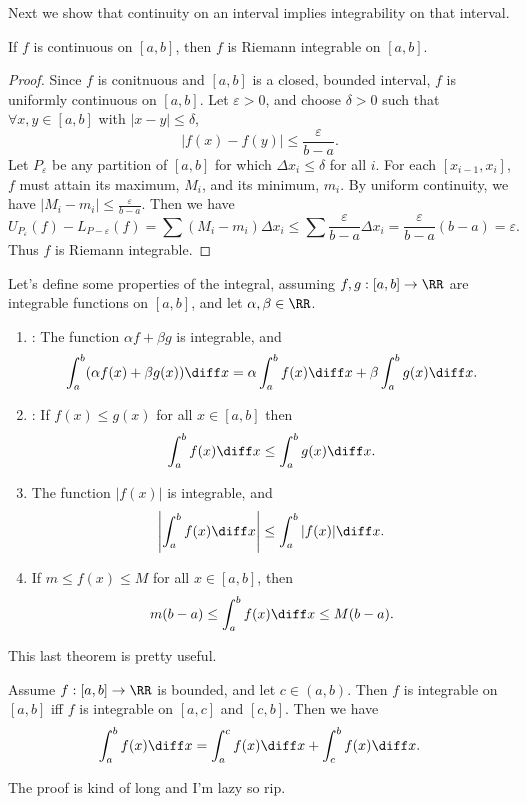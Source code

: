 Next we show that continuity on an interval implies integrability on that interval. 

\begin{theorem}
If $f$ is continuous on $[a,b]$, then $f$ is Riemann integrable on $[a,b]$. 
\end{theorem}
\begin{proof}
Since $f$ is conitnuous and $[a,b]$ is a closed, bounded interval, $f$ is uniformly continuous on $[a,b]$. Let $\varepsilon > 0$, and choose $\delta > 0$ such that $\forall x,y \in [a,b]$ with $|x-y| \leq \delta$, 
\[ |f(x) - f(y)| \leq \dfrac{\varepsilon}{b-a}. \]
Let $P_\varepsilon$ be any partition of $[a,b]$ for which $\Delta x_i \leq \delta$ for all $i$. For each $[x_{i-1}, x_i]$, $f$ must attain its maximum, $M_i$, and its minimum, $m_i$. By uniform continuity, we have $|M_i - m_i| \leq \frac{\varepsilon}{b-a}$. Then we have 
\[ U_{P_\varepsilon}(f) - L_{P-\varepsilon}(f) = \sum (M_i - m_i)\Delta x_i \leq \sum \dfrac{\varepsilon}{b-a} \Delta x_i = \dfrac{\varepsilon}{b-a} (b-a) = \varepsilon. \] Thus $f$ is Riemann integrable. 
\end{proof}

\begin{definition}
Let's define some properties of the integral, assuming $f,g : [a,b] \to \RR$ are integrable functions on $[a,b]$, and let $\alpha, \beta \in \RR$. 
\begin{enumerate}
\item {}: The function $\alpha f + \beta g$ is integrable, and 
\[ \int_a^b (\alpha f(x) + \beta g(x)) \diff x = \alpha \int_a^b f(x) \diff x + \beta\int_a^b g(x) \diff x. \]
\item {}: If $f(x) \leq g(x)$ for all $x \in [a,b]$ then 
\[ \int_a^b f(x) \diff x \leq \int_a^b g(x) \diff x. \]
\item The function $|f(x)|$ is integrable, and 
\[\left | \int_a^b f(x) \diff x \right | \leq \int_a^b |f(x)| \diff x. \]
\item If $m \leq f(x) \leq M$ for all $x \in [a,b]$, then 
\[ m(b-a) \leq \int_a^b f(x) \diff x \leq M(b-a). \]
\end{enumerate}
\end{definition}

This last theorem is pretty useful. 

\begin{theorem}
Assume $f: [a,b] \to \RR$ is bounded, and let $c \in (a,b)$. Then $f$ is integrable on $[a,b]$ iff $f$ is integrable on $[a,c]$ and $[c,b]$. Then we have 
\[ \int_a^b f(x) \diff x = \int_a^c f(x) \diff x + \int_c^b f(x) \diff x. \]
\end{theorem}
The proof is kind of long and I'm lazy so rip. 

